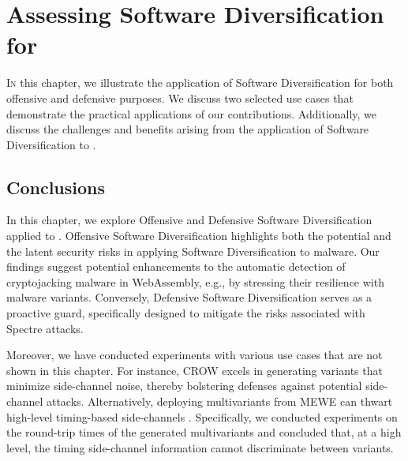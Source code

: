 \chapter{Assessing Software Diversification for \Wasm}
\label{exploit}




\vspace{12mm}

\lettrine[lines=3]{I}{n} this chapter, we illustrate the application of Software Diversification for both offensive and defensive purposes.
We discuss two selected use cases that demonstrate the practical applications of our contributions.
Additionally, we discuss the challenges and benefits arising from the application of Software Diversification to \Wasm.









% 

\section*{Conclusions}
In this chapter, we explore Offensive and Defensive Software Diversification applied to \Wasm.
Offensive Software Diversification highlights both the potential and the latent security risks in applying Software Diversification to \Wasm malware. 
Our findings suggest potential enhancements to the automatic detection of cryptojacking malware in WebAssembly, e.g., by stressing their resilience with \Wasm malware variants. 
Conversely, Defensive Software Diversification serves as a proactive guard, specifically designed to mitigate the risks associated with Spectre attacks. 

Moreover, we have conducted experiments with various use cases that are not shown in this chapter.
For instance, CROW \cite{CROW} excels in generating \Wasm variants that minimize side-channel noise, thereby bolstering defenses against potential side-channel attacks. 
Alternatively, deploying multivariants from MEWE \cite{MEWE} can thwart high-level timing-based side-channels \cite{morgan2015web}. 
Specifically, we conducted experiments on the round-trip times of the generated multivariants and concluded that, at a high level, the timing side-channel information cannot discriminate between variants. 
